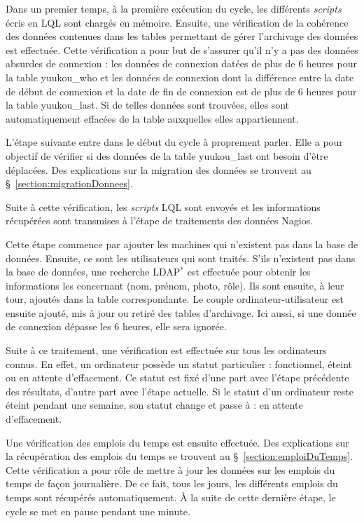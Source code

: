 Dans un premier temps, \`a la premi\`ere ex\'ecution du cycle, les diff\'erents \textit{scripts} \'ecris en LQL sont charg\'es en m\'emoire.
Ensuite, une v\'erification de la coh\'erence des donn\'ees contenues dans les tables permettant de g\'erer l'archivage des donn\'ees est effectu\'ee.
Cette v\'erification a pour but de s'assurer qu'il n'y a pas des donn\'ees absurdes de connexion : les donn\'ees de connexion dat\'ees de plus de 6 heures pour la table \textsf{yuukou\_who} et les donn\'ees de connexion dont la diff\'erence entre la date de d\'ebut de connexion et la date de fin de connexion est de plus de 6 heures pour la table \textsf{yuukou\_last}.
Si de telles donn\'ees sont trouv\'ees, elles sont automatiquement effac\'ees de la table auxquelles elles appartiennent.

L'\'etape suivante entre dans le d\'ebut du cycle \`a proprement parler.
Elle a pour objectif de v\'erifier si des donn\'ees de la table \textsf{yuukou\_last} ont besoin d'\^etre d\'eplac\'ees.
Des explications sur la migration des donn\'ees se trouvent au \S~\ref{section:migrationDonnees}.

Suite \`a cette v\'erification, les \textit{scripts} LQL sont envoy\'es et les informations r\'ecup\'er\'ees sont transmises \`a l'\'etape de traitements des donn\'ees Nagios.

Cette \'etape commence par ajouter les machines qui n'existent pas dans la base de donn\'ees.
Ensuite, ce sont les utilisateurs qui sont trait\'es.
S'ils n'existent pas dans la base de donn\'ees, une recherche LDAP$^*$ est effectu\'ee pour obtenir les informations les concernant (nom, pr\'enom, photo, r\^ole).
Ils sont ensuite, \`a leur tour, ajout\'es dans la table correspondante.
Le couple ordinateur-utilisateur est ensuite ajout\'e, mis \`a jour ou retir\'e des tables d'archivage.
Ici aussi, si une donn\'ee de connexion d\'epasse les 6 heures, elle sera ignor\'ee.

Suite \`a ce traitement, une v\'erification est effectu\'ee sur tous les ordinateurs connus.
En effet, un ordinateur poss\`ede un statut particulier : fonctionnel, \'eteint ou en attente d'effacement.
Ce statut est fix\'e d'une part avec l'\'etape pr\'ec\'edente des r\'esultats, d'autre part avec l'\'etape actuelle.
Si le statut d'un ordinateur reste \'eteint pendant une semaine, son statut change et passe \`a : en attente d'effacement.

Une v\'erification des emplois du temps est ensuite effectu\'ee.
Des explications sur la r\'ecup\'eration des emplois du temps se trouvent au \S~\ref{section:emploiDuTemps}.
Cette v\'erification a pour r\^ole de mettre \`a jour les donn\'ees sur les emplois du temps de fa\c{c}on journali\`ere.
De ce fait, tous les jours, les diff\'erents emplois du temps sont r\'ecup\'er\'es automatiquement.
\`A la suite de cette derni\`ere \'etape, le cycle se met en pause pendant une minute.

